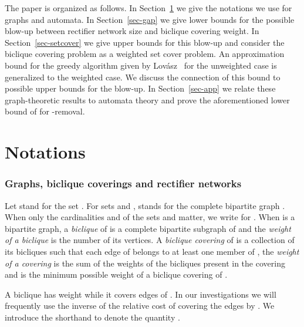 \documentclass[submission]{llncs}
\begin{document}
  The paper is organized as follows. In Section~\ref{sec-notations} we give the notations we use for graphs and automata.
  In Section~\ref{sec-gap} we give lower bounds for the possible blow-up between rectifier network size and biclique covering weight.
  In Section~\ref{sec-setcover} we give upper bounds for this blow-up and consider
  the biclique covering problem as a weighted set cover problem. An approximation bound for the greedy algorithm
  given by Lov\'asz~\cite{Lovasz1975383} for the unweighted case is generalized to the weighted case.
  We discuss the connection of this bound to possible upper bounds for the blow-up.
  In Section~\ref{sec-app} we relate these graph-theoretic results to automata theory and prove the aforementioned
  lower bound of  for -removal.
\section{Notations}
\label{sec-notations}
\subsubsection{Graphs, biclique coverings and rectifier networks}
  Let  stand for the set .
  For sets  and ,  stands for the complete bipartite graph .
  When only the cardinalities  and  of the sets  and  matter, we write  for .
  When  is a bipartite graph,
  a \emph{biclique} of  is a complete bipartite subgraph of  and
  the \emph{weight of a biclique} is the number of its vertices.
  A \emph{biclique covering} of  is a collection  of its bicliques such that each edge of  belongs to at least one member of ,
  the \emph{weight of a covering} is the sum of the weights of the bicliques present in the covering
  and  is the minimum possible weight of a biclique covering of .

  A biclique  has weight  while it covers  edges of .
  In our investigations we will frequently use the inverse  of the relative cost of covering the edges by .
  We introduce the shorthand  to denote the quantity .
\end{document}
